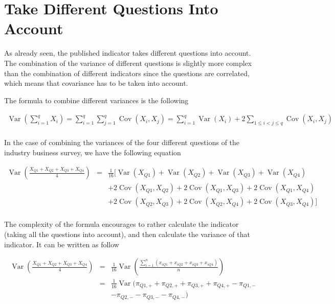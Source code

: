 \documentclass[12pt,a4paper,oneside]{book}
\DeclareMathOperator{\Var}{Var}
\DeclareMathOperator{\Cov}{Cov}
\begin{document}
\section{Take Different Questions Into Account}

As already seen, the published indicator takes different questions into account. 
The combination of the variance of different questions is slightly more complex than the combination of different indicators since the questions are correlated, which means that covariance has to be taken into account.

The formula to combine different variances is the following

\begin{eqnarray}
\Var \left(\sum_{i=1}^{q} X_{i}\right) = \sum_{i=1}^{q} \sum_{j=1}^{q} \Cov\left(X_{i}, X_{j}\right)
= \sum_{i=1}^{q} \Var\left(X_{i}\right)+2 \sum_{1 \leq i<j \leq q} \Cov\left(X_{i}, X_{j}\right) \\ \nonumber
\end{eqnarray} 

In the case of combining the variances of the four different questions of the industry business survey, we have the following equation

\begin{eqnarray}
    \Var \left(\frac{X_{Q1} + X_{Q2} + X_{Q3} + X_{Q4}}{4} \right) 
    &=& \frac{1}{16} \Big[ \Var(X_{Q1}) + \Var(X_{Q2}) + \Var(X_{Q3}) + \Var(X_{Q4}) \nonumber \\
    && + 2 \Cov (X_{Q1},X_{Q2}) + 2 \Cov (X_{Q1},X_{Q3}) + 2 \Cov (X_{Q1},X_{Q4}) \nonumber \\
    &&  + 2 \Cov (X_{Q2},X_{Q3}) + 2 \Cov (X_{Q2},X_{Q4}) + 2 \Cov (X_{Q3},X_{Q4}) \Big] \nonumber \\
\end{eqnarray}

The complexity of the formula encourages to rather calculate the indicator (taking all the questions into account), and then calculate the variance of that indicator. It can be written as follow

\begin{eqnarray}
    \Var \left(\frac{X_{Q1} + X_{Q2} + X_{Q3} + X_{Q4}}{4} \right) 
    &=& \frac{1}{16} \Var \left(\frac{\sum_{i=1}^n \left(x_{i Q1} + x_{i Q2} + x_{i Q3} + x_{i Q4} \right)}{n} \right) \nonumber \\
    &=& \frac{1}{16} \Var \big(\pi_{Q1,+} + \pi_{Q2,+} + \pi_{Q3,+} + \pi_{Q4,+} - \pi_{Q1,-} \nonumber \\
&& - \pi_{Q2,-} - \pi_{Q3,-} - \pi_{Q4,-}  \big) 
\end{eqnarray}
\end{document}
